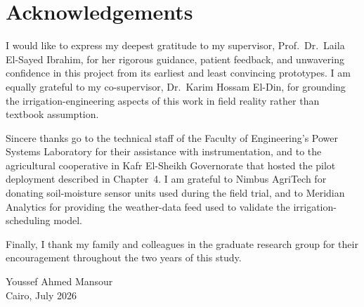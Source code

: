 \chapter*{Acknowledgements}

I would like to express my deepest gratitude to my supervisor, Prof.\ Dr.\ Laila El-Sayed
Ibrahim, for her rigorous guidance, patient feedback, and unwavering confidence in this
project from its earliest and least convincing prototypes. I am equally grateful to my
co-supervisor, Dr.\ Karim Hossam El-Din, for grounding the irrigation-engineering aspects of
this work in field reality rather than textbook assumption.

Sincere thanks go to the technical staff of the Faculty of Engineering's Power Systems
Laboratory for their assistance with instrumentation, and to the agricultural cooperative in
Kafr El-Sheikh Governorate that hosted the pilot deployment described in Chapter~4. I am
grateful to Nimbus AgriTech for donating soil-moisture sensor units used during the field
trial, and to Meridian Analytics for providing the weather-data feed used to validate the
irrigation-scheduling model.

Finally, I thank my family and colleagues in the graduate research group for their
encouragement throughout the two years of this study.

\vspace{0.3in}
\begin{flushright}
Youssef Ahmed Mansour\\
Cairo, July 2026
\end{flushright}

\newpage
\thispagestyle{plain}
